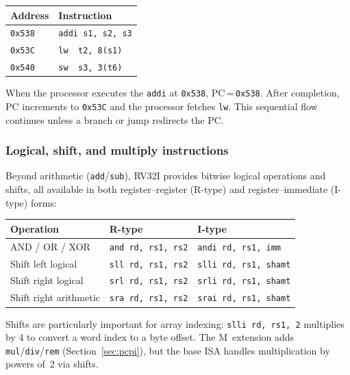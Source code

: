 \documentclass[9pt, a4paper]{extarticle}
\begin{document}
\begin{center}\small
\begin{tabular}{@{}l l@{}}
    \toprule
    Address & Instruction \\
    \midrule
    \texttt{0x538} & \texttt{addi s1, s2, s3} \\
    \texttt{0x53C} & \texttt{lw~~t2, 8(s1)} \\
    \texttt{0x540} & \texttt{sw~~s3, 3(t6)} \\
    \bottomrule
\end{tabular}
\end{center}

When the processor executes the \texttt{addi} at \texttt{0x538}, PC\,=\,\texttt{0x538}. After completion, PC increments to \texttt{0x53C} and the processor fetches \texttt{lw}. This sequential flow continues unless a branch or jump redirects the PC.

\subsubsection{Logical, shift, and multiply instructions}

Beyond arithmetic (\texttt{add}/\texttt{sub}), RV32I provides bitwise logical operations and shifts, all available in both register--register (R-type) and register--immediate (I-type) forms:

\begin{center}\small
\begin{tabular}{@{}l l l@{}}
    \toprule
    Operation & R-type & I-type \\
    \midrule
    AND / OR / XOR & \texttt{and rd, rs1, rs2} & \texttt{andi rd, rs1, imm} \\
    Shift left logical & \texttt{sll rd, rs1, rs2} & \texttt{slli rd, rs1, shamt} \\
    Shift right logical & \texttt{srl rd, rs1, rs2} & \texttt{srli rd, rs1, shamt} \\
    Shift right arithmetic & \texttt{sra rd, rs1, rs2} & \texttt{srai rd, rs1, shamt} \\
    \bottomrule
\end{tabular}
\end{center}

Shifts are particularly important for array indexing: \texttt{slli rd, rs1, 2} multiplies by 4 to convert a word index to a byte offset. The M~extension adds \texttt{mul}/\texttt{div}/\texttt{rem} (Section~\ref{sec:pcpi}), but the base ISA handles multiplication by powers of~2 via shifts.
\end{document}
